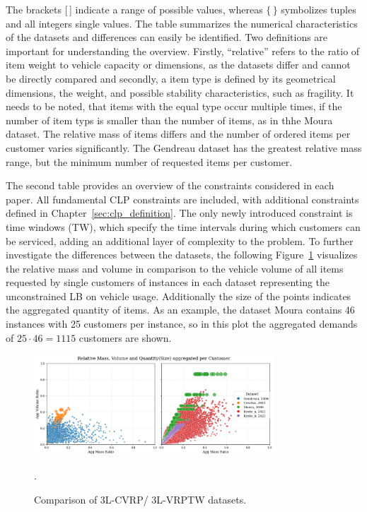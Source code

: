 \clearpage


The brackets [\,] indicate a range of possible values, whereas $\{\,\}$ symbolizes tuples and all integers single values. The table summarizes the numerical characteristics of the datasets and differences can easily be identified. Two definitions are important for understanding the overview.
Firstly, “relative” refers to the ratio of item weight to vehicle capacity or dimensions, as the datasets differ and cannot be directly compared and secondly, a item type is defined by its geometrical dimensions, the weight, and possible stability characteristics, such as fragility. It needs to be noted,
that items with the equal type occur multiple times, if the number of item typs is smaller than the
number of items, as in thhe Moura dataset. The relative mass of items differs and the number of ordered
items per customer varies significantly. The Gendreau dataset has the greatest relative mass range, but
the minimum number of requested items per customer.



The second table provides an overview of the constraints considered in each paper. All fundamental \gls{CLP} constraints are included, with additional constraints defined in Chapter~\ref{sec:clp_definition}.
The only newly introduced constraint is time windows (TW), which specify the time intervals during which customers can be serviced, adding an additional layer of complexity to the problem.
To further investigate the differences between the datasets, the following Figure~\ref{fig:dataset_comparison}
visualizes the relative mass and volume in comparison to the vehicle volume of all items
requested by single customers of instances in each dataset representing the unconstrained \gls{LB}
on vehicle usage. Additionally the size of the points indicates the aggregated quantity of items.
As an example, the dataset Moura contains 46 instances with 25 customers per instance,
so in this plot the aggregated demands of $25\cdot46= 1115$ customers are shown.

\begin{figure}[h]
    \centering
    \includegraphics[width=0.8\textwidth]{pictures/comparison_datasets_3lcvrp.png}
    \caption{Comparison of 3L-CVRP/ 3L-VRPTW datasets.}.
    \label{fig:dataset_comparison}
\end{figure}


